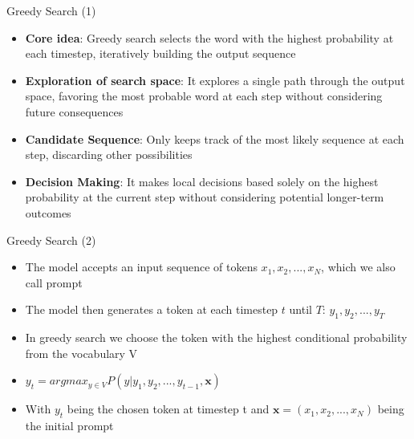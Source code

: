 \begin{frame}{Greedy Search (1)}

\vfill

\begin{itemize}
    \item \textbf{Core idea}: Greedy search selects the word with the highest probability at each timestep, iteratively building the output sequence
    \item \textbf{Exploration of search space}: It explores a single path through the output space, favoring the most probable word at each step without considering future consequences
    \item \textbf{Candidate Sequence}: Only keeps track of the most likely sequence at each step, discarding other possibilities
    \item \textbf{Decision Making}: It makes local decisions based solely on the highest probability at the current step without considering potential longer-term outcomes
\end{itemize}

\vfill
    
\end{frame}


\begin{frame}{Greedy Search (2)}

\vfill

\begin{itemize}
    \item The model accepts an input sequence of tokens $x_1, x_2,...,x_N$, which we also call prompt
    \item The model then generates a token at each timestep $t$ until $T$: $y_1,y_2,...,y_T$
    \item In greedy search we choose the token with the highest conditional probability from the vocabulary V
    \item $y_t = argmax_{y \in V}P(y|y_1,y_2,...,y_{t-1},\mathbf{x})$
    \item With $y_t$ being the chosen token at timestep t and $\mathbf{x} = (x_1, x_2,...,x_N)$ being the initial prompt
\end{itemize}

\vfill

\end{frame}


